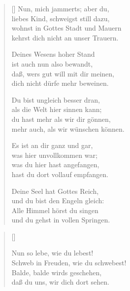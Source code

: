 \begin{multicols}{2}
\begin{verse}[\versewidth]
 Nun, mich jammerts; aber du,\\
liebes Kind, schweigst still dazu,\\
wohnst in Gottes Stadt und Mauern\\
kehrst dich nicht an unser Trauern.

 Deines Wesens hoher Stand\\
ist auch nun also bewandt,\\
daß, wers gut will mit dir meinen,\\
dich nicht dürfe mehr beweinen.

 Du bist ungleich besser dran,\\
als die Welt hier sinnen kann;\\
du hast mehr als wir dir gönnen,\\
mehr auch, als wir wünschen können.

 Es ist an dir ganz und gar,\\
was hier unvollkommen war;\\
was du hier hast angefangen,\\
hast du dort vollauf empfangen.

 Deine Seel hat Gottes Reich,\\
und du bist den Engeln gleich:\\
Alle Himmel hörst du singen\\
und du gehst in vollen Springen.

\end{verse}
\end{multicols}

\begin{center}
\settowidth{\versewidth}{Der, vor dem die Welt erschrickt,}
\begin{verse}[\versewidth]

 Nun so lebe, wie du lebest!\\
Schweb in Freuden, wie du schwebest!\\
Balde, balde wirds geschehen,\\
daß du uns, wir dich dort sehen.

\end{verse}
\end{center}

